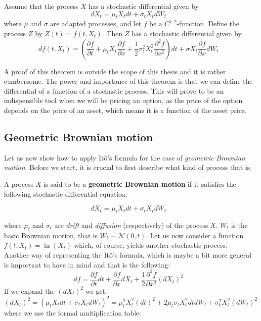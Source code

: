 \documentclass[times, utf8, diplomski]{fer}
\begin{document}
\begin{theorem}[It\^{o}'s Lemma]
Assume that the process $X$ has a stochastic differential given by $$dX_t = \mu_t X_t dt + \sigma_t X_t dW_t$$ where $\mu$ and $\sigma$ are adapted processes, and let $f$ be a $C^{1,2}$-function. Define the process $Z$ by $Z(t) = f(t,X_t)$. Then $Z$ has a stochastic differential given by 
$$df(t, X_t) = \left(\frac{\partial f}{\partial t} + \mu_t X_t \frac{\partial f}{\partial x}+\frac{1}{2}\sigma_t^2 X_t^2 \frac{\partial^2f}{\partial x^2}\right)dt + \sigma X_t \frac{\partial f}{\partial x}dW_t$$
\end{theorem}
\noindent A proof of this theorem is outside the scope of this thesis and it is rather cumbersome. The power and importance of this theorem is that we can define the differential of a function of a stochastic process. This will prove to be an indispensible tool when we will be pricing an option, as the price of the option depends on the price of an asset, which means it is a function of the asset price.

\subsection{Geometric Brownian motion} \label{section_gbm}
Let us now show how to apply It\^{o}'s formula for the case of \textit{geometric Brownian motion}. Before we start, it is crucial to first describe what kind of process that is. 

\begin{definition}
A process $X$ is said to be a \textbf{geometric Brownian motion} if it satisfies the following stochastic differential equation:

$$dX_t = \mu_t X_t dt + \sigma_t X_t dW_t$$

\end{definition}

\noindent where $\mu_t$ and $\sigma_t$ are \textit{drift} and \textit{diffusion} (respectively) of the process $X$. $W_t$ is the basic Brownian motion, that is $W_t \sim \mathcal{N}(0,t)$. Let us now consider a function $f(t,X_t) = \ln(X_t)$ which, of course, yields another stochastic process. Another way of representing the It\^{o}'s formula, which is maybe a bit more general is important to have in mind and that is the following: $$df = \frac{\partial f}{\partial t}dt + \frac{\partial f}{\partial x}dX_t + \frac{1}{2}\frac{\partial^2 f}{\partial x^2}(dX_t)^2$$
If we expand the $(dX_t)^2$ we get: $$(dX_t)^2 = (\mu_t X_t dt + \sigma_t X_t dW_t)^2 = \mu_t^2 X_t^2 (dt)^2 + 2\mu_t\sigma_tX_t^2dtdW_t + \sigma_t^2X_t^2(dW_t)^2$$ where we use the formal multiplication table: 
\end{document}
